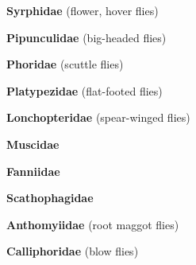 \documentclass[letterpaper,10pt]{article}
\begin{document}
{\makebox[0.6cm]{}  \textbf{Syrphidae} (flower, hover flies) \par
\makebox[0.6cm]{}  \textbf{Pipunculidae} (big-headed flies) \par
\makebox[0.6cm]{}  \textbf{Phoridae} (scuttle flies) \par
\makebox[0.6cm]{}  \textbf{Platypezidae} (flat-footed flies) \par
\makebox[0.6cm]{}  \textbf{Lonchopteridae} (spear-winged flies) \par
\makebox[0.6cm]{}  \textbf{Muscidae} \par
\makebox[0.6cm]{}  \textbf{Fanniidae} \par
\makebox[0.6cm]{}  \textbf{Scathophagidae} \par
\makebox[0.6cm]{}  \textbf{Anthomyiidae} (root maggot flies) \par
\makebox[0.6cm]{}  \textbf{Calliphoridae} (blow flies) \par
}
\end{document}
